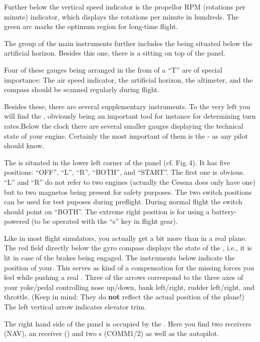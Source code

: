 Further below the vertical speed indicator is the propellor RPM (rotations per minute)
indicator, which displays the rotations per minute  in hundreds. The
green arc marks the optimum region for long-time flight.

The group of the main instruments further includes the 
being
situated below the artificial horizon. Besides this one, there is a
 sitting on top of the panel.

Four of these gauges being arranged in the from of a ``T'' are of special
importance: The
air speed indicator, the artificial horizon, the altimeter, and the compass
should be
scanned regularly during flight.

Besides these, there are several supplementary instruments. To the very
left you will find the , obviously being an important tool
for instance for determining turn rates.Below the clock there are
several smaller gauges displaying the technical state of your engine.
Certainly the most important of them is the  - as
any pilot should know.

The  is situated in the lower left corner of the
panel (cf. Fig.\,4). It has five positions: ``OFF'', ``L'', ``R'',
``BOTH'', and ``START''. The first one is obvious. ``L'' and ``R'' do
not refer to two engines (actually the Cessna does only have one) but
to two magnetos being present for safety purposes. The two switch
positions can be used for test puposes during preflight. During normal
flight the switch should point on ``BOTH''. The extreme right position
is for  using a battery-powered
 (to be operated with the ``s'' key in flight gear).

Like in most flight simulators, you actually get a bit more than in a
real plane. The red field directly below the gyro compass displays the
state of the , i.e., it is lit in case of the brakes
being engaged. The instruments below indicate the position of
your. This serves as kind of a compensation for the missing
forces you feel while pushing a real . Three of the arrows
correspond to the three axes of your yoke/pedal controlling nose
up/down, bank left/right, rudder left/right, and throttle. (Keep in
mind: They do \textbf{not} reflect the actual position of the plane!)
The left vertical arrow indicates elevator trim.

The right hand side of the panel is occupied by the . Here
you find
two  receivers (NAV), an  receiver
() and two s
(COMM1/2) as
well as the autopilot.

